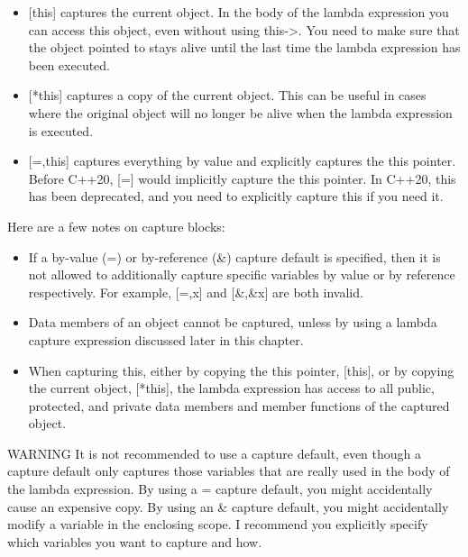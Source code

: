 \begin{itemize}
\item
{}[this] captures the current object. In the body of the lambda expression you can access this object, even without using this->. You need to make sure that the object pointed to stays alive until the last time the lambda expression has been executed.

\item
{}[*this] captures a copy of the current object. This can be useful in cases where the original object will no longer be alive when the lambda expression is executed.

\item
{}[=,this] captures everything by value and explicitly captures the this pointer. Before C++20, [=] would implicitly capture the this pointer. In C++20, this has been deprecated, and you need to explicitly capture this if you need it.
\end{itemize}

Here are a few notes on capture blocks:

\begin{itemize}
\item
If a by-value (=) or by-reference (\&) capture default is specified, then it is not allowed to additionally capture specific variables by value or by reference respectively. For example, [=,x] and [\&,\&x] are both invalid.

\item
Data members of an object cannot be captured, unless by using a lambda capture expression discussed later in this chapter.

\item
When capturing this, either by copying the this pointer, [this], or by copying the current object, [*this], the lambda expression has access to all public, protected, and private data members and member functions of the captured object.
\end{itemize}

\begin{myWarning}{WARNING}
It is not recommended to use a capture default, even though a capture default only captures those variables that are really used in the body of the lambda expression. By using a = capture default, you might accidentally cause an expensive copy. By using an \& capture default, you might accidentally modify a variable in the enclosing scope. I recommend you explicitly specify which variables you want to capture and how.
\end{myWarning}

